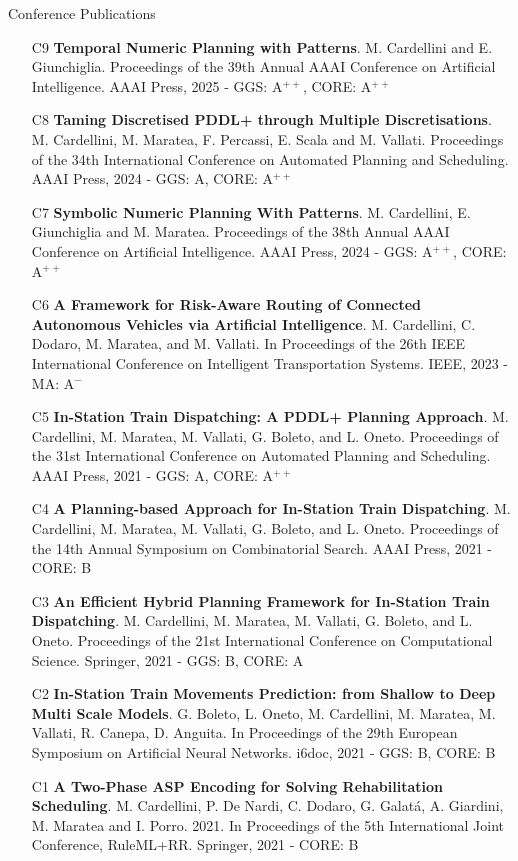 \documentclass{resume} %
\begin{document}
\begin{rSection}{Conference Publications}
\begin{enumerate}[leftmargin=5mm]
	\item[C9] \textbf{Temporal Numeric Planning with Patterns}. M. Cardellini and E. Giunchiglia. Proceedings of the 39th Annual AAAI Conference on Artificial Intelligence. AAAI Press, 2025 - GGS: A$^{++}$, CORE: A$^{++}$
	\item[C8] \textbf{Taming Discretised PDDL+ through Multiple Discretisations}. M. Cardellini, M. Maratea, F. Percassi, E. Scala and M. Vallati. Proceedings of the 34th International Conference on Automated Planning and Scheduling. AAAI Press, 2024 - GGS: A, CORE: A$^{++}$
	
	\item[C7] \textbf{Symbolic Numeric Planning With Patterns}. M. Cardellini, E. Giunchiglia and M. Maratea. Proceedings of the 38th Annual AAAI Conference on Artificial Intelligence. AAAI Press, 2024 - GGS: A$^{++}$, CORE: A$^{++}$
	
	\item[C6] \textbf{A Framework for Risk-Aware Routing of Connected Autonomous Vehicles via Artificial Intelligence}. M. Cardellini, C. Dodaro, M. Maratea, and M. Vallati. In Proceedings of the 26th IEEE International Conference on Intelligent Transportation Systems. IEEE, 2023 - MA: A$^-$
	
	\item[C5] \textbf{In-Station Train Dispatching: A PDDL+ Planning Approach}. M. Cardellini, M. Maratea, M. Vallati, G. Boleto, and L. Oneto. Proceedings of the 31st International Conference on Automated Planning and Scheduling. AAAI Press, 2021 - GGS: A, CORE: A$^{++}$
	
	\item[C4] \textbf{A Planning-based Approach for In-Station Train Dispatching}. M. Cardellini, M. Maratea, M. Vallati, G. Boleto, and L. Oneto.  Proceedings of the 14th Annual Symposium on Combinatorial Search. {AAAI} Press,  2021 - CORE: B
	
	\item[C3] \textbf{An Efficient Hybrid Planning Framework for In-Station Train Dispatching}. M. Cardellini, M. Maratea, M. Vallati, G. Boleto, and L. Oneto. Proceedings of the 21st International Conference on Computational Science. Springer, 2021 - GGS: B, CORE: A
	
	\item[C2] \textbf{In-Station Train Movements Prediction: from Shallow to Deep Multi Scale Models}. G. Boleto, L. Oneto, M. Cardellini, M. Maratea, M. Vallati, R. Canepa, D. Anguita. In Proceedings of the 29th European Symposium on Artificial Neural Networks. i6doc, 2021 - GGS: B, CORE: B
	
	\item[C1] \textbf{A Two-Phase ASP Encoding for Solving Rehabilitation Scheduling}. M. Cardellini, P. De Nardi, C. Dodaro, G. Galat\'a, A. Giardini, M. Maratea and I. Porro. 2021. In Proceedings of the 5th International Joint Conference, RuleML+RR. Springer, 2021 - CORE: B
\end{enumerate}
\end{rSection}
\end{document}
